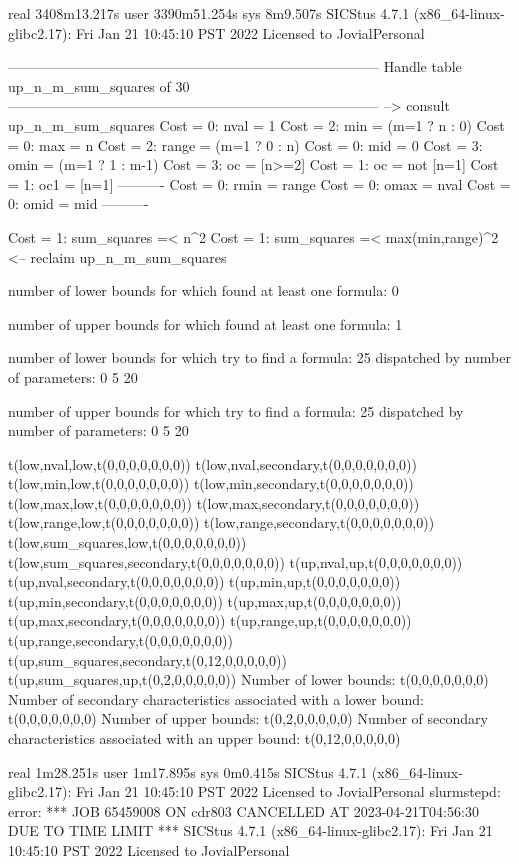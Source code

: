 real	3408m13.217s
user	3390m51.254s
sys	8m9.507s
SICStus 4.7.1 (x86_64-linux-glibc2.17): Fri Jan 21 10:45:10 PST 2022
Licensed to JovialPersonal


--------------------------------------------------------------------------------
Handle table up_n_m_sum_squares of 30
--------------------------------------------------------------------------------
--> consult up_n_m_sum_squares
Cost =  0:  nval  = 1
Cost =  2:  min   = (m=1 ? n : 0)
Cost =  0:  max   = n
Cost =  2:  range = (m=1 ? 0 : n)
Cost =  0:  mid   = 0
Cost =  3:  omin  = (m=1 ? 1 : m-1)
Cost =  3:  oc    = [n>=2]
Cost =  1:  oc    = not [n=1]
Cost =  1:  oc1   = [n=1]
----------
Cost =  0:  rmin  = range
Cost =  0:  omax  = nval
Cost =  0:  omid  = mid
----------

Cost =  1:  sum_squares =< n^2
Cost =  1:  sum_squares =< max(min,range)^2
<-- reclaim up_n_m_sum_squares

number of lower bounds for which found at least one formula: 0

number of upper bounds for which found at least one formula: 1

number of lower bounds for which try to find a formula: 25
dispatched by number of parameters: 0  5  20

number of upper bounds for which try to find a formula: 25
dispatched by number of parameters: 0  5  20

t(low,nval,low,t(0,0,0,0,0,0,0))
t(low,nval,secondary,t(0,0,0,0,0,0,0))
t(low,min,low,t(0,0,0,0,0,0,0))
t(low,min,secondary,t(0,0,0,0,0,0,0))
t(low,max,low,t(0,0,0,0,0,0,0))
t(low,max,secondary,t(0,0,0,0,0,0,0))
t(low,range,low,t(0,0,0,0,0,0,0))
t(low,range,secondary,t(0,0,0,0,0,0,0))
t(low,sum_squares,low,t(0,0,0,0,0,0,0))
t(low,sum_squares,secondary,t(0,0,0,0,0,0,0))
t(up,nval,up,t(0,0,0,0,0,0,0))
t(up,nval,secondary,t(0,0,0,0,0,0,0))
t(up,min,up,t(0,0,0,0,0,0,0))
t(up,min,secondary,t(0,0,0,0,0,0,0))
t(up,max,up,t(0,0,0,0,0,0,0))
t(up,max,secondary,t(0,0,0,0,0,0,0))
t(up,range,up,t(0,0,0,0,0,0,0))
t(up,range,secondary,t(0,0,0,0,0,0,0))
t(up,sum_squares,secondary,t(0,12,0,0,0,0,0))
t(up,sum_squares,up,t(0,2,0,0,0,0,0))
Number of lower bounds:                                             t(0,0,0,0,0,0,0)
Number of secondary characteristics associated with a lower bound:  t(0,0,0,0,0,0,0)
Number of upper bounds:                                             t(0,2,0,0,0,0,0)
Number of secondary characteristics associated with an upper bound: t(0,12,0,0,0,0,0)

real	1m28.251s
user	1m17.895s
sys	0m0.415s
SICStus 4.7.1 (x86_64-linux-glibc2.17): Fri Jan 21 10:45:10 PST 2022
Licensed to JovialPersonal
slurmstepd: error: *** JOB 65459008 ON cdr803 CANCELLED AT 2023-04-21T04:56:30 DUE TO TIME LIMIT ***
SICStus 4.7.1 (x86_64-linux-glibc2.17): Fri Jan 21 10:45:10 PST 2022
Licensed to JovialPersonal


